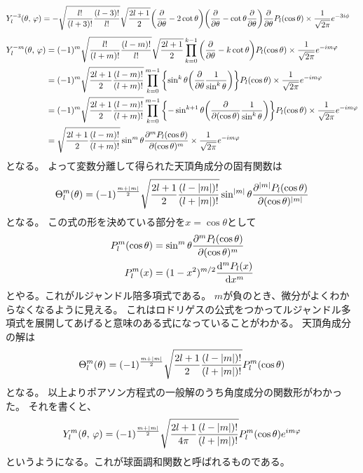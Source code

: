 \documentclass[../../master.tex]{subfiles}
\begin{document}
\begin{equation}\begin{aligned}[b]
    Y_l^{-3}(\theta,\,\varphi)
	 & =-\sqrt{\frac{l!}{(l+3)!}\frac{(l-3)!}{l!}}\sqrt{\frac{2l+1}{2}}\qty(\pdv{\theta}-2\cot\theta)\qty(\pdv{\theta}-\cot\theta\pdv{\theta})\pdv{\theta}P_l(\cos\theta)\times\frac{1}{\sqrt{2\pi}}e^{-3i\phi}
\end{aligned}\end{equation}
\begin{equation}\begin{aligned}[b]
    Y_l^{-m}(\theta,\,\varphi)
	 & =(-1)^m\sqrt{\frac{l!}{(l+m)!}\frac{(l-m)!}{l!}}\sqrt{\frac{2l+1}{2}} \prod_{k=0}^{k-1}\qty(\pdv{\theta}-k\cot\theta)P_l(\cos\theta)\times\frac{1}{\sqrt{2\pi}}e^{-im\varphi}                    \\
	 & =(-1)^m\sqrt{\frac{2l+1}{2}\frac{(l-m)!}{(l+m)!}} \prod_{k=0}^{m-1}\qty{\sin^k\theta\qty(\pdv{\theta}\frac{1}{\sin^k\theta})}P_l(\cos\theta)\times\frac{1}{\sqrt{2\pi}}e^{-im\varphi}            \\
	 & =(-1)^m\sqrt{\frac{2l+1}{2}\frac{(l-m)!}{(l+m)!}} \prod_{k=0}^{m-1}\qty{-\sin^{k+1}\theta\qty(\pdv{(\cos\theta)}\frac{1}{\sin^k\theta})}P_l(\cos\theta)\times\frac{1}{\sqrt{2\pi}}e^{-im\varphi} \\
	 & =\sqrt{\frac{2l+1}{2}\frac{(l-m)!}{(l+m)!}} \sin^{m}\theta\pdv[m]{P_l(\cos\theta)}{(\cos\theta)}\times\frac{1}{\sqrt{2\pi}}e^{-im\varphi}
\end{aligned}\end{equation}
となる。
よって変数分離して得られた天頂角成分の固有関数は
\begin{equation}
	\Theta_l^m(\theta) = (-1)^{\frac{m+\abs{m}}{2}}\sqrt{\frac{2l+1}{2}\frac{(l-\abs{m})!}{(l+\abs{m})!}} \sin^{\abs{m}}\theta\pdv[\abs{m}]{P_l(\cos\theta)}{(\cos\theta)}
\end{equation}
となる。
この式の形を決めている部分を\(x=\cos\theta\)として
\begin{align}
	P_l^m(\cos\theta) &= \sin^m\theta\pdv[m]{P_l(\cos\theta)}{(\cos\theta)}\\
	P_l^m(x) &=(1-x^2)^{m/2}\dv[m]{P_l(x)}{x}
\end{align}
とやる。これがルジャンドル陪多項式である。
\(m\)が負のとき、微分がよくわからなくなるように見える。
これはロドリゲスの公式をつかってルジャンドル多項式を展開してあげると意味のある式になっていることがわかる。
天頂角成分の解は
\begin{equation}
	\Theta_l^m(\theta) = (-1)^{\frac{m+\abs{m}}{2}}\sqrt{\frac{2l+1}{2}\frac{(l-\abs{m})!}{(l+\abs{m})!}} P_l^{m}(\cos\theta)
\end{equation}
となる。
以上よりポアソン方程式の一般解のうち角度成分の関数形がわかった。
それを書くと、
\begin{equation}
	Y_l^m(\theta,\,\varphi) = (-1)^{\frac{m+\abs{m}}{2}}\sqrt{\frac{2l+1}{4\pi}\frac{(l-\abs{m})!}{(l+\abs{m})!}}P_l^{m}(\cos\theta)e^{im\varphi}
\end{equation}
というようになる。これが球面調和関数と呼ばれるものである。
\end{document}

